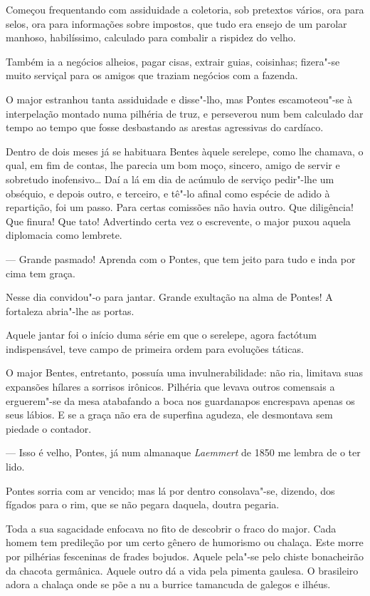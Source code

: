 Começou frequentando com assiduidade a coletoria, sob pretextos vários,
ora para selos, ora para informações sobre impostos, que tudo era ensejo
de um parolar manhoso, habilíssimo, calculado para combalir a rispidez
do velho.

Também ia a negócios alheios, pagar cisas, extrair guias, coisinhas;
fizera"-se muito serviçal para os amigos que traziam negócios com a
fazenda.

O major estranhou tanta assiduidade e disse"-lho, mas Pontes
escamoteou"-se à interpelação montado numa pilhéria de truz, e perseverou
num bem calculado dar tempo ao tempo que fosse desbastando as arestas
agressivas do cardíaco.

Dentro de dois meses já se habituara Bentes àquele serelepe, como lhe
chamava, o qual, em fim de contas, lhe parecia um bom moço, sincero,
amigo de servir e sobretudo inofensivo\ldots{} Daí a lá em dia de acúmulo de
serviço pedir"-lhe um obséquio, e depois outro, e terceiro, e tê"-lo
afinal como espécie de adido à repartição, foi um passo. Para certas
comissões não havia outro. Que diligência! Que finura! Que tato!
Advertindo certa vez o escrevente, o major puxou aquela diplomacia como
lembrete.

--- Grande pasmado! Aprenda com o Pontes, que tem jeito para tudo e inda
por cima tem graça.

Nesse dia convidou"-o para jantar. Grande exultação na alma de Pontes! A
fortaleza abria"-lhe as portas.

Aquele jantar foi o início duma série em que o serelepe, agora factótum
indispensável, teve campo de primeira ordem para evoluções táticas.

O major Bentes, entretanto, possuía uma invulnerabilidade: não ria,
limitava suas expansões hílares a sorrisos irônicos. Pilhéria que levava
outros comensais a erguerem"-se da mesa atabafando a boca nos guardanapos
encrespava apenas os seus lábios. E se a graça não era de superfina
agudeza, ele desmontava sem piedade o contador.

--- Isso é velho, Pontes, já num almanaque \emph{Laemmert} de 1850 me
lembra de o ter lido.

Pontes sorria com ar vencido; mas lá por dentro consolava"-se, dizendo,
dos fígados para o rim, que se não pegara daquela, doutra pegaria.

Toda a sua sagacidade enfocava no fito de descobrir o fraco do major.
Cada homem tem predileção por um certo gênero de humorismo ou chalaça.
Este morre por pilhérias fesceninas de frades bojudos. Aquele pela"-se
pelo chiste bonacheirão da chacota germânica. Aquele outro dá a vida
pela pimenta gaulesa. O brasileiro adora a chalaça onde se põe a nu a
burrice tamancuda de galegos e ilhéus.

